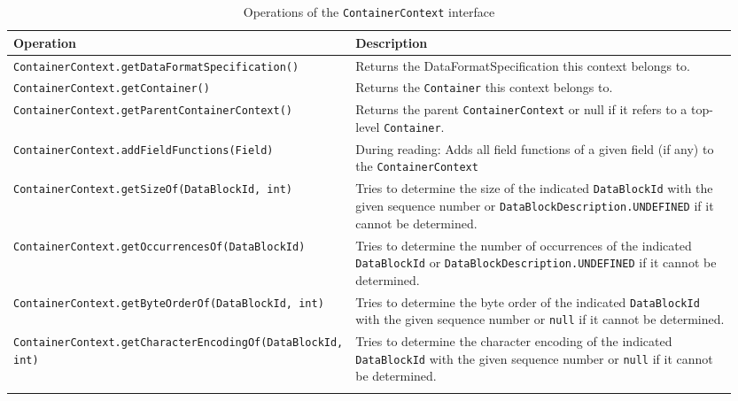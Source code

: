 \small
\begin{landscape}
\begin{longtable}{|p{0.3\linewidth}|p{0.65\linewidth}|}
\hline
\rowcolor[gray]{.9}\textbf{Operation} & \textbf{Description} \\
\endhead
\hline
\texttt{ContainerContext}\linebreak\texttt{.getDataFormatSpecification()} & Returns the DataFormatSpecification this context belongs to. \\
\hline
\texttt{ContainerContext}\linebreak\texttt{.getContainer()} & Returns the \texttt{Container} this context belongs to. \\
\hline
\texttt{ContainerContext}\linebreak\texttt{.getParentContainerContext()} & Returns the parent \texttt{ContainerContext} or null if it refers to a top-level \texttt{Container}. \\
\hline
\texttt{ContainerContext}\linebreak\texttt{.addFieldFunctions(Field)} & During reading: Adds all field functions of a given field (if any) to the \texttt{ContainerContext} \\
\hline
\texttt{ContainerContext}\linebreak\texttt{.getSizeOf(DataBlockId, int)} & Tries to determine the size of the indicated \texttt{DataBlockId} with the given sequence number or \texttt{DataBlockDescription.UNDEFINED} if it cannot be determined.\\
\hline
\texttt{ContainerContext}\linebreak\texttt{.getOccurrencesOf(DataBlockId)} & Tries to determine the number of occurrences of the indicated \texttt{DataBlockId}  or \texttt{DataBlockDescription.UNDEFINED} if it cannot be determined. \\
\hline
\texttt{ContainerContext}\linebreak\texttt{.getByteOrderOf(DataBlockId, int)} & Tries to determine the byte order of the indicated \texttt{DataBlockId}  with the given sequence number or \texttt{null} if it cannot be determined. \\
\hline
\texttt{ContainerContext}\linebreak\texttt{.getCharacterEncodingOf(DataBlockId, int)} & Tries to determine the character encoding of the indicated \texttt{DataBlockId}  with the given sequence number or \texttt{null} if it cannot be determined. \\
\hline
\caption{Operations of the \texttt{ContainerContext} interface}
\label{tab:DBOpsContainerContext}
\end{longtable}
\end{landscape}
\normalsize

